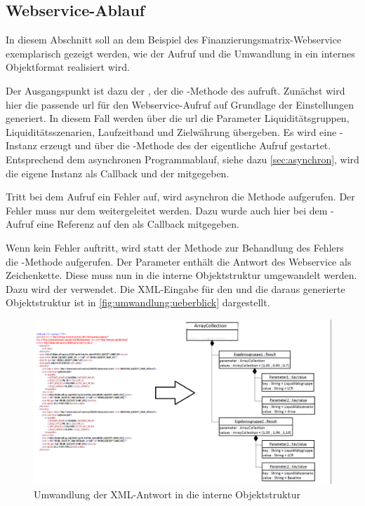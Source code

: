 \begin{onehalfspacing}
\subsection{Webservice-Ablauf}
In diesem Abschnitt soll an dem Beispiel des Finanzierungsmatrix-Webservice exemplarisch gezeigt werden, wie der Aufruf und die Umwandlung in ein internes Objektformat realisiert wird.

Der Ausgangspunkt ist dazu der , der die -Methode des  aufruft. Zunächst wird hier die passende \gls{url} für den Webservice-Aufruf auf Grundlage der Einstellungen generiert. In diesem Fall werden über die \gls{url} die Parameter Liquiditätsgruppen, Liquiditätsszenarien, Laufzeitband und Zielwährung übergeben. Es wird eine -Instanz erzeugt und über die -Methode des  der eigentliche Aufruf gestartet. Entsprechend dem asynchronen Programmablauf, siehe dazu \vref{sec:asynchron}, wird die eigene Instanz als Callback und der  mitgegeben.

Tritt bei dem Aufruf ein Fehler auf, wird asynchron die Methode  aufgerufen. Der Fehler muss nur dem  weitergeleitet werden. Dazu wurde auch hier bei dem -Aufruf eine Referenz auf den  als Callback mitgegeben.

Wenn kein Fehler auftritt, wird statt der Methode zur Behandlung des Fehlers die -Methode aufgerufen. Der Parameter  enthält die Antwort des Webservice als Zeichenkette. Diese muss nun in die interne Objektstruktur umgewandelt werden. Dazu wird der   verwendet. Die \gls{XML}-Eingabe für den  und die daraus generierte Objektstruktur ist in \vref{fig:umwandlung:ueberblick} dargestellt.

\begin{figure}[h]
\centering
\setlength{\unitlength}{1mm}
\includegraphics[width=15cm]{images/umwandlung.png}
\caption{Umwandlung der XML-Antwort in die interne Objektstruktur\label{fig:umwandlung:ueberblick}}
\end{figure} 


\end{onehalfspacing}
